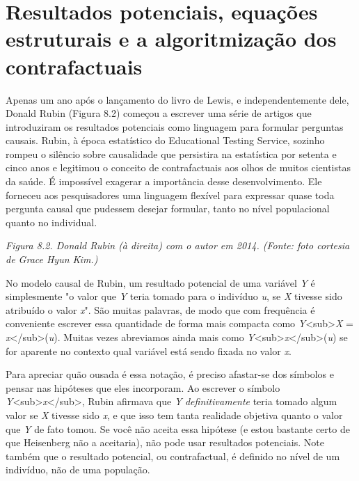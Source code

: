 \documentclass[11pt,a5paper,twoside]{book}
\begin{document}
\section{Resultados potenciais, equações estruturais e a algoritmização dos contrafactuais}
Apenas um ano após o lançamento do livro de Lewis, e independentemente dele, Donald Rubin (Figura 8.2) começou a escrever uma série de artigos que introduziram os resultados potenciais como linguagem para formular perguntas causais. Rubin, à época estatístico do Educational Testing Service, sozinho rompeu o silêncio sobre causalidade que persistira na estatística por setenta e cinco anos e legitimou o conceito de contrafactuais aos olhos de muitos cientistas da saúde. É impossível exagerar a importância desse desenvolvimento. Ele forneceu aos pesquisadores uma linguagem flexível para expressar quase toda pergunta causal que pudessem desejar formular, tanto no nível populacional quanto no individual.

\textit{Figura 8.2. Donald Rubin (à direita) com o autor em 2014. (Fonte: foto cortesia de Grace Hyun Kim.)}

No modelo causal de Rubin, um resultado potencial de uma variável \textit{Y} é simplesmente "o valor que \textit{Y} teria tomado para o indivíduo \textit{u}, se \textit{X} tivesse sido atribuído o valor \textit{x}". São muitas palavras, de modo que com frequência é conveniente escrever essa quantidade de forma mais compacta como \textit{Y}<sub>\textit{X} = \textit{x}</sub>(\textit{u}). Muitas vezes abreviamos ainda mais como \textit{Y}<sub>\textit{x}</sub>(\textit{u}) se for aparente no contexto qual variável está sendo fixada no valor \textit{x}.

Para apreciar quão ousada é essa notação, é preciso afastar-se dos símbolos e pensar nas hipóteses que eles incorporam. Ao escrever o símbolo \textit{Y}<sub>\textit{x}</sub>, Rubin afirmava que \textit{Y} \textit{definitivamente} teria tomado algum valor se \textit{X} tivesse sido \textit{x}, e que isso tem tanta realidade objetiva quanto o valor que \textit{Y} de fato tomou. Se você não aceita essa hipótese (e estou bastante certo de que Heisenberg não a aceitaria), não pode usar resultados potenciais. Note também que o resultado potencial, ou contrafactual, é definido no nível de um indivíduo, não de uma população.
\end{document}
